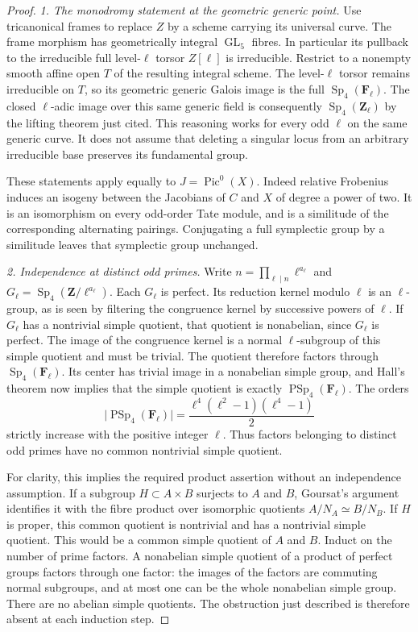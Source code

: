 \begin{proof}
\emph{1. The monodromy statement at the geometric generic
point.}
Use tricanonical frames to replace $Z$ by a scheme carrying
its universal curve.  The frame morphism has geometrically
integral $\operatorname{GL}_5$ fibres.  In particular its
pullback to the irreducible full level-$\ell$ torsor
$Z[\ell]$ is irreducible.  Restrict to a nonempty smooth
affine open $T$ of the resulting integral scheme.  The
level-$\ell$ torsor remains irreducible on $T$, so its
geometric generic Galois image is the full
$\operatorname{Sp}_4(\mathbf F_\ell)$.
The closed $\ell$-adic image over this same generic field
is consequently $\operatorname{Sp}_4(\mathbf Z_\ell)$ by
the lifting theorem just cited.  This reasoning works for
every odd $\ell$ on the same generic curve.  It does not
assume that deleting a singular locus from an arbitrary
irreducible base preserves its fundamental group.

These statements apply equally to $J=\operatorname{Pic}^0(X)$.
Indeed relative Frobenius induces an isogeny between the
Jacobians of $C$ and $X$ of degree a power of two.  It is an
isomorphism on every odd-order Tate module, and is a
similitude of the corresponding alternating pairings.
Conjugating a full symplectic group by a similitude leaves
that symplectic group unchanged.

\emph{2. Independence at distinct odd primes.}
Write $n=\prod_{\ell\mid n}\ell^{a_\ell}$ and
$G_\ell=\operatorname{Sp}_4(\mathbf Z/\ell^{a_\ell})$.
Each $G_\ell$ is perfect.  Its reduction kernel modulo
$\ell$ is an $\ell$-group, as is seen by filtering the
congruence kernel by successive powers of $\ell$.
If $G_\ell$ has a nontrivial simple quotient, that quotient
is nonabelian, since $G_\ell$ is perfect.  The image of the
congruence kernel is a normal $\ell$-subgroup of this simple
quotient and must be trivial.  The quotient therefore
factors through $\operatorname{Sp}_4(\mathbf F_\ell)$.
Its center has trivial image in a nonabelian simple group,
and Hall's theorem now implies that the simple quotient is
exactly $\operatorname{PSp}_4(\mathbf F_\ell)$.
The orders
\[
 \bigl|\operatorname{PSp}_4(\mathbf F_\ell)\bigr|
       =\frac{\ell^4(\ell^2-1)(\ell^4-1)}2                  \tag{GO.2}
\]
strictly increase with the positive integer $\ell$.
Thus factors belonging to distinct odd primes have no
common nontrivial simple quotient.

For clarity, this implies the required product assertion
without an independence assumption.  If a subgroup
$H\subset A\times B$ surjects to $A$ and $B$, Goursat's
argument identifies it with the fibre product over
isomorphic quotients $A/N_A\simeq B/N_B$.  If $H$ is
proper, this common quotient is nontrivial and has a
nontrivial simple quotient.  This would be a common simple
quotient of $A$ and $B$.  Induct on the number of prime
factors.  A nonabelian simple quotient of a product of
perfect groups factors through one factor: the images of
the factors are commuting normal subgroups, and at most
one can be the whole nonabelian simple group.  There are
no abelian simple quotients.  The obstruction just
described is therefore absent at each induction step.


\end{proof}
